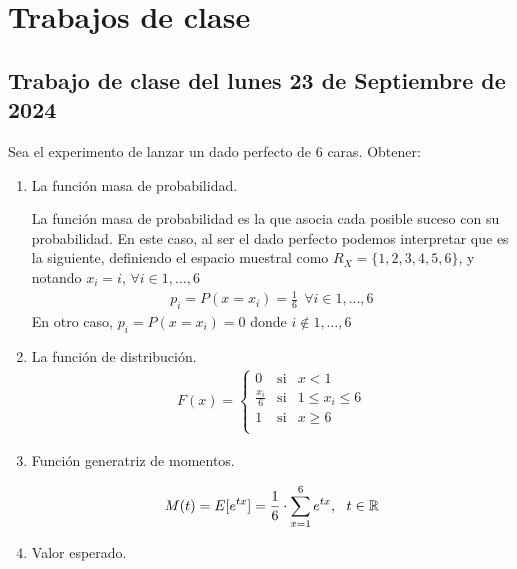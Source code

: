 \chapter{Trabajos de clase}

\section{Trabajo de clase del lunes 23 de Septiembre de 2024}

\begin{ejercicio} Sea el experimento de lanzar un dado perfecto de 6 caras. Obtener:
    \begin{enumerate}[label=\alph*)]
        \item La función masa de probabilidad.
        
        La función masa de probabilidad es la que asocia cada posible suceso con su probabilidad. En este caso, al ser el dado perfecto podemos interpretar que es la siguiente, definiendo el espacio muestral como $R_X=\{1,2,3,4,5,6\}$, y notando $x_i=i$, $\forall i \in 1,\dots, 6$
        \begin{gather*}
            p_i=P(x=x_i) = \frac{1}{6}\ \ \forall i\in 1,\dots,6
        \end{gather*}
        En otro caso, $p_i=P(x=x_i)=0$ donde $i\notin 1,\dots,6$
        \item La función de distribución.
        \begin{gather*}
            F(x)=\left\{
            \begin{array}{ccc}
                0 & \text{si} & x<1 \\
                \frac{x_i}{6} & \text{si} & 1 \leq x_i \leq 6\\
                1 &  \text{si} & x \geq 6\\
            \end{array}
            \right.
        \end{gather*}
        \item Función generatriz de momentos.

        \begin{gather*}
            M(t)=E[e^{tx}]=\frac{1}{6} \cdot \sum\limits_{x=1}^6e^{tx},\ \ t \in \bb{R}
        \end{gather*}

        \item Valor esperado.
        

\end{enumerate}
\end{ejercicio}
